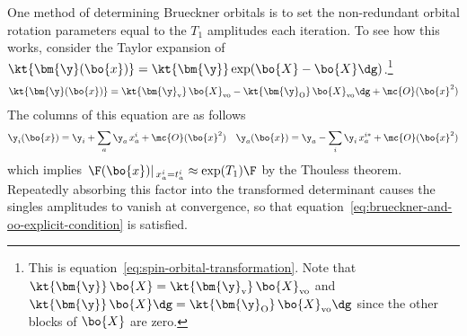 \begin{rmk}
\label{rmk:brueckner-algorithm-explanation}
One method of determining Brueckner orbitals is to set the non-redundant orbital rotation parameters equal to the $T_1$ amplitudes each iteration.
To see how this works, consider the Taylor expansion of
$
  \kt{\bm{\y}(\bo{x})}
=
  \kt{\bm{\y}}\,
  \text{exp}(\bo{X} - \bo{X}\dg)
$.\footnote{%
  This is equation~\ref{eq:spin-orbital-transformation}.
  Note that
  $
    \kt{\bm{\y}}\,
    \bo{X}
  =
    \kt{\bm{\y}_{\text{v}}}\,
    \bo{X}_{\text{vo}}
  $
  and
  $
    \kt{\bm{\y}}\,
    \bo{X}\dg
  =
    \kt{\bm{\y}_{\text{O}}}\,
    \bo{X}_{\text{vo}}\dg
  $
  since the other blocks of $\bo{X}$ are zero.
}
\begin{align}
  \kt{\bm{\y}(\bo{x})}
=
  \kt{\bm{\y}_{\text{v}}}\,
  \bo{X}_{\text{vo}}
-
  \kt{\bm{\y}_{\text{O}}}\,
  \bo{X}_{\text{vo}}\dg
+
  \mc{O}(\bo{x}^2)
\end{align}
The columns of this equation are as follows
\begin{align}
  \y_i(\bo{x})
=
  \y_i
+
  \sum_a
  \y_a\,
  x_a^i
+
  \mc{O}(\bo{x}^2)
&&
  \y_a(\bo{x})
=
  \y_a
-
  \sum_i
  \y_i\,
  x_a^{i*}
+
  \mc{O}(\bo{x}^2)
\end{align}
which implies
$
\left.
  \F(\bo{x})
\right|{}_{x_a^i=t_a^i}
\approx
  \text{exp}(T_1)
  \F
$
by the Thouless theorem.
Repeatedly absorbing this factor into the transformed determinant causes the singles amplitudes to vanish at convergence, so that equation~\ref{eq:brueckner-and-oo-explicit-condition} is satisfied.
\end{rmk}


